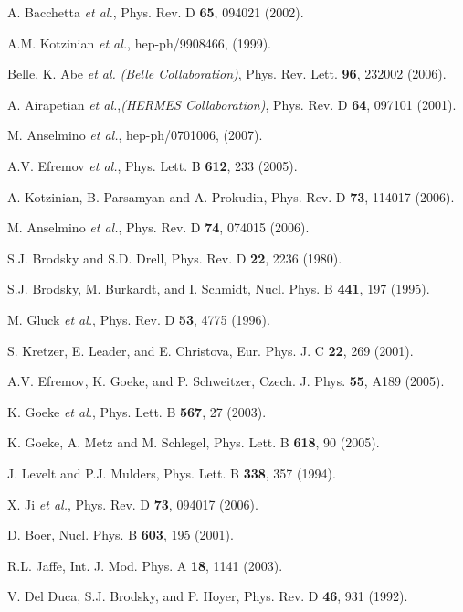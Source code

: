 \begin{thebibliography}{199}
A. Bacchetta {\it et al.}, Phys. Rev. D {\bf 65}, 094021 (2002).

A.M. Kotzinian {\it et al.}, hep-ph/9908466, (1999).

Belle, K. Abe {\it et al.} {\it (Belle Collaboration)}, Phys. Rev. Lett. 
{\bf 96}, 232002 (2006).

A. Airapetian {\it et al.},{\it (HERMES Collaboration)}, Phys. Rev. D
{\bf 64}, 097101 (2001).

M. Anselmino {\it et al.}, hep-ph/0701006, (2007).

A.V. Efremov {\it et al.}, Phys. Lett. B {\bf 612}, 233 (2005).

A. Kotzinian, B. Parsamyan and A. Prokudin, Phys. Rev. D {\bf 73},
114017 (2006).

M. Anselmino {\it et al.}, Phys. Rev. D {\bf 74}, 074015 (2006).

S.J. Brodsky and S.D. Drell, Phys. Rev. D {\bf 22}, 2236 (1980).

S.J. Brodsky, M. Burkardt, and I. Schmidt, Nucl. Phys. B {\bf 441},
197 (1995).

M. Gluck {\it et al.}, Phys. Rev. D {\bf 53}, 4775 (1996).

S. Kretzer, E. Leader, and E. Christova, Eur. Phys. J. C {\bf 22},
269 (2001).

A.V. Efremov, K. Goeke, and P. Schweitzer, Czech. J. Phys. {\bf 55},
A189 (2005).

K. Goeke {\it et al.}, Phys. Lett. B {\bf 567}, 27 (2003).

K. Goeke, A. Metz and M. Schlegel, Phys. Lett. B {\bf 618}, 90 (2005).

J. Levelt and P.J. Mulders, Phys. Lett. B {\bf 338}, 357 (1994).

X. Ji {\it et al.}, Phys. Rev. D {\bf 73}, 094017 (2006).

D. Boer, Nucl. Phys. B {\bf 603}, 195 (2001).

R.L. Jaffe, Int. J. Mod. Phys. A {\bf 18}, 1141 (2003).

%
%

V. Del Duca, S.J. Brodsky, and P. Hoyer, Phys. Rev. D {\bf 46}, 931 (1992).


\end{thebibliography}
